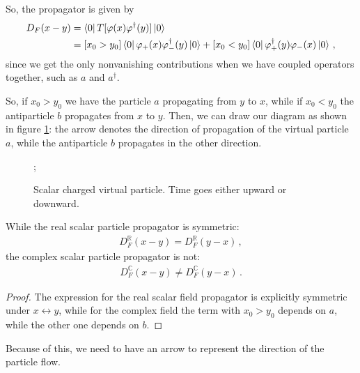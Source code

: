 \documentclass[main.tex]{subfiles}
\begin{document}
So, the propagator is given by 
%
\begin{subequations}
\begin{align}
D_F (x-y) &= \bra{0} T [\varphi (x) \varphi ^\dag (y)] \ket{0}  \\
&= [x_0 > y_0 ] \bra{0} \varphi_{+} (x) \varphi_{-}^\dag(y) \ket{0}
+ [x_0 < y_0 ] \bra{0} \varphi_{+}^\dag(y) \varphi_{-}(x) \ket{0}
\,,
\end{align}
\end{subequations}
%
since we get the only nonvanishing contributions when we have coupled operators together, such as \(a \) and \(a ^\dag\). 

So, if \(x_0 > y_0 \) we have the particle \(a\) propagating from \(y\) to \(x\), while if \(x_0 < y_0 \) the antiparticle \(b\) propagates from \(x\) to \(y\). 
Then, we can draw our diagram as shown in figure \ref{fig:virtual-charged-scalar-particle-diagram}: the arrow denotes the direction of propagation of the virtual particle \(a\), while the antiparticle \(b\) propagates in the other direction. 

\begin{figure}[ht]
\centering
{};
\caption{Scalar charged virtual particle. Time goes either upward or downward.}
\label{fig:virtual-charged-scalar-particle-diagram}
\end{figure}

\begin{claim}
While the real scalar particle propagator is symmetric: 
%
\begin{align}
D_F^{\mathbb{R}} (x-y)  =D_F^{\mathbb{R}} (y-x)
\,,
\end{align}
%
the complex scalar particle propagator is not: 
%
\begin{align}
D_F^{\mathbb{C}} (x-y) \neq D_F^{\mathbb{C}} (y-x)
\,.
\end{align}
\end{claim}

\begin{proof}
The expression for the real scalar field propagator is explicitly symmetric under \(x \leftrightarrow y\), while for the complex field the term with \(x_0 > y_0 \) depends on \(a\), while the other one depends on \(b\).  
\end{proof}

Because of this, we need to have an arrow to represent the direction of the particle flow. 
\end{document}
